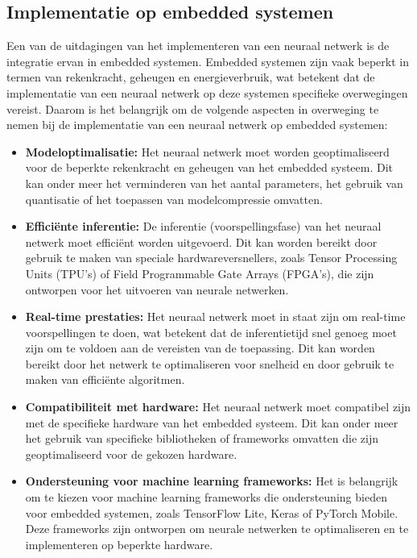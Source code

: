 \begin{itemize}
\subsection{Implementatie op embedded systemen}
Een van de uitdagingen van het implementeren van een neuraal netwerk is de integratie ervan in embedded systemen. Embedded systemen zijn vaak beperkt in termen van rekenkracht, geheugen en energieverbruik, wat betekent dat de implementatie van een neuraal netwerk op deze systemen specifieke overwegingen vereist. Daarom is het belangrijk om de volgende aspecten in overweging te nemen bij de implementatie van een neuraal netwerk op embedded systemen:
\begin{itemize}
  \item \textbf{Modeloptimalisatie:} Het neuraal netwerk moet worden geoptimaliseerd voor de beperkte rekenkracht en geheugen van het embedded systeem. Dit kan onder meer het verminderen van het aantal parameters, het gebruik van quantisatie of het toepassen van modelcompressie omvatten.
  \item \textbf{Efficiënte inferentie:} De inferentie (voorspellingsfase) van het neuraal netwerk moet efficiënt worden uitgevoerd. Dit kan worden bereikt door gebruik te maken van speciale hardwareversnellers, zoals Tensor Processing Units (TPU's) of Field Programmable Gate Arrays (FPGA's), die zijn ontworpen voor het uitvoeren van neurale netwerken.
  \item \textbf{Real-time prestaties:} Het neuraal netwerk moet in staat zijn om real-time voorspellingen te doen, wat betekent dat de inferentietijd snel genoeg moet zijn om te voldoen aan de vereisten van de toepassing. Dit kan worden bereikt door het netwerk te optimaliseren voor snelheid en door gebruik te maken van efficiënte algoritmen.
  \item \textbf{Compatibiliteit met hardware:} Het neuraal netwerk moet compatibel zijn met de specifieke hardware van het embedded systeem. Dit kan onder meer het gebruik van specifieke bibliotheken of frameworks omvatten die zijn geoptimaliseerd voor de gekozen hardware.
  \item \textbf{Ondersteuning voor machine learning frameworks:} Het is belangrijk om te kiezen voor machine learning frameworks die ondersteuning bieden voor embedded systemen, zoals TensorFlow Lite, Keras of PyTorch Mobile. Deze frameworks zijn ontworpen om neurale netwerken te optimaliseren en te implementeren op beperkte hardware.
\end{itemize}
 

\end{itemize}
